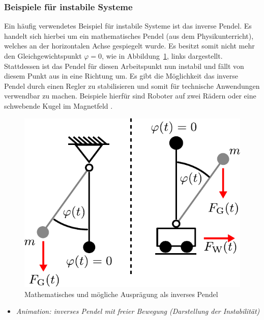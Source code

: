 \subsubsection{Beispiele für instabile Systeme}
%
Ein häufig verwendetes Beispiel für instabile Systeme ist das inverse Pendel. Es handelt sich hierbei um ein mathematisches Pendel (aus dem Physikunterricht), welches an der horizontalen Achse gespiegelt wurde. Es besitzt somit nicht mehr den Gleichgewichtspunkt $\varphi=0$, wie in Abbildung~\ref{fig:inversespendel}, links dargestellt. Stattdessen ist das Pendel für diesen Arbeitspunkt nun instabil und fällt von diesem Punkt aus in eine Richtung um. Es gibt die Möglichkeit das inverse Pendel durch einen Regler zu stabilisieren und somit für technische Anwendungen verwendbar zu machen. Beispiele hierfür sind Roboter auf zwei Rädern \cite{Lunze10} oder eine schwebende Kugel im Magnetfeld \cite{Dastych13}.
%
\begin{figure}[h]
	\centering
	\includegraphics[width=0.5\linewidth]{Abbildungen/Systemanalyse/PDF/InversesPendel.pdf}
	\caption{Mathematisches und mögliche Ausprägung als inverses Pendel}
	\label{fig:inversespendel}
\end{figure}  
%
\begin{python}{}{}
	\begin{itemize}
		\item \textit{Animation: inverses Pendel mit freier Bewegung (Darstellung der Instabilität)}
	\end{itemize}
\end{python}
%
